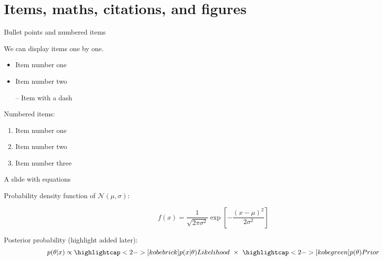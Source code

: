 \documentclass[12pt]{beamer}
\begin{document}

\section{Items, maths, citations, and figures}

\begin{frame}{Bullet points and numbered items}

We can display items one by one.

\pause

\begin{itemize}[<+->]
    \item Item \alert<2>{number one}
    \item Item \alert<3>{number two}
    \item[--] Item with a \alert<4>{dash}
\end{itemize}

\pause
Numbered items:

\begin{enumerate}[<+->]
    \item Item \alert<6>{number one}
    \item Item \alert<7>{number two}
    \item Item \alert<8>{number three}
\end{enumerate}
\end{frame}



\begin{frame}{A slide with equations}

Probability density function of $\mathcal{N}(\mu, \sigma)$:

\begin{equation*}
f(x) = \frac{1}{\sqrt{2\pi\sigma^2}} \exp \left[ - \frac{(x-\mu)^2}{2\sigma^2} \right]
\end{equation*}

\bigskip

Posterior probability (highlight added later):
\begin{equation*}
p(\theta | x) \propto 
	\highlightcap<2->[kobebrick]{p(x | \theta)}{\footnotesize Likelihood}
	~\times~
	\highlightcap<2->[kobegreen]{p(\theta)}{\footnotesize Prior}
\end{equation*}

\end{frame}
\end{document}
